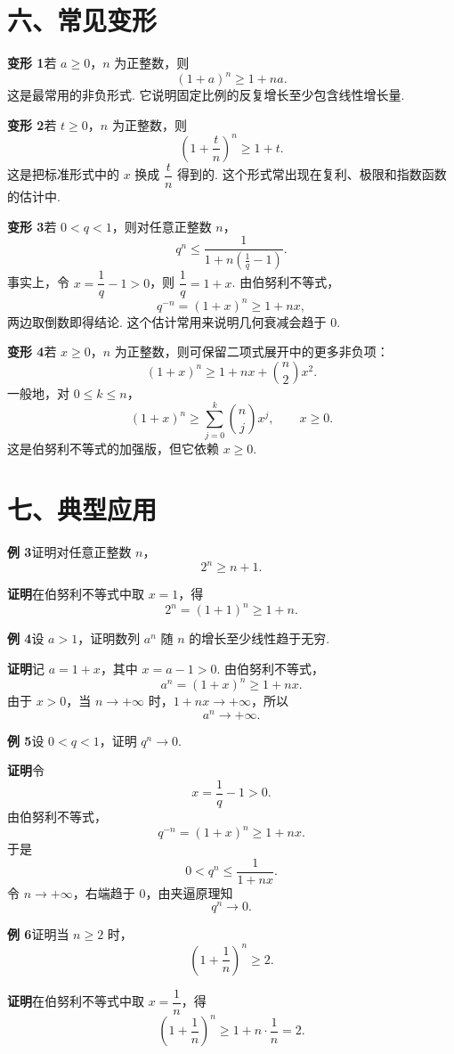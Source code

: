 \documentclass[UTF8,12pt,a4paper,fontset=fandol]{ctexart}
\begin{document}
\section*{六、常见变形}

\noindent\textbf{变形 1}\quad 若 $a\ge0$，$n$ 为正整数，则
\[
  (1+a)^n\ge1+na.
\]
这是最常用的非负形式. 它说明固定比例的反复增长至少包含线性增长量.

\noindent\textbf{变形 2}\quad 若 $t\ge0$，$n$ 为正整数，则
\[
  \left(1+\frac{t}{n}\right)^n\ge1+t.
\]
这是把标准形式中的 $x$ 换成 $\dfrac tn$ 得到的. 这个形式常出现在复利、极限和指数函数的估计中.

\noindent\textbf{变形 3}\quad 若 $0<q<1$，则对任意正整数 $n$，
\[
  q^n\le \frac1{1+n\left(\frac1q-1\right)}.
\]
事实上，令 $x=\dfrac1q-1>0$，则 $\dfrac1q=1+x$. 由伯努利不等式，
\[
  q^{-n}=\left(1+x\right)^n\ge1+nx,
\]
两边取倒数即得结论. 这个估计常用来说明几何衰减会趋于 $0$.

\noindent\textbf{变形 4}\quad 若 $x\ge0$，$n$ 为正整数，则可保留二项式展开中的更多非负项：
\[
  (1+x)^n\ge1+nx+\binom n2x^2.
\]
一般地，对 $0\le k\le n$，
\[
  (1+x)^n\ge \sum_{j=0}^k\binom njx^j,\qquad x\ge0.
\]
这是伯努利不等式的加强版，但它依赖 $x\ge0$.

\section*{七、典型应用}

\noindent\textbf{例 3}\quad 证明对任意正整数 $n$，
\[
  2^n\ge n+1.
\]

\noindent\textbf{证明}\quad 在伯努利不等式中取 $x=1$，得
\[
  2^n=(1+1)^n\ge1+n.
\]

\noindent\textbf{例 4}\quad 设 $a>1$，证明数列 $a^n$ 随 $n$ 的增长至少线性趋于无穷.

\noindent\textbf{证明}\quad 记 $a=1+x$，其中 $x=a-1>0$. 由伯努利不等式，
\[
  a^n=(1+x)^n\ge1+nx.
\]
由于 $x>0$，当 $n\to+\infty$ 时，$1+nx\to+\infty$，所以
\[
  a^n\to+\infty.
\]

\noindent\textbf{例 5}\quad 设 $0<q<1$，证明 $q^n\to0$.

\noindent\textbf{证明}\quad 令
\[
  x=\frac1q-1>0.
\]
由伯努利不等式，
\[
  q^{-n}=\left(1+x\right)^n\ge1+nx.
\]
于是
\[
  0<q^n\le\frac1{1+nx}.
\]
令 $n\to+\infty$，右端趋于 $0$，由夹逼原理知
\[
  q^n\to0.
\]

\noindent\textbf{例 6}\quad 证明当 $n\ge2$ 时，
\[
  \left(1+\frac1n\right)^n\ge2.
\]

\noindent\textbf{证明}\quad 在伯努利不等式中取 $x=\dfrac1n$，得
\[
  \left(1+\frac1n\right)^n\ge1+n\cdot\frac1n=2.
\]
\end{document}
